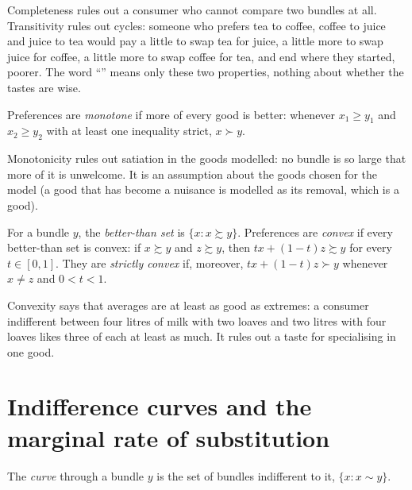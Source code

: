 Completeness rules out a consumer who cannot compare two bundles at all.
Transitivity rules out cycles: someone who prefers tea to coffee, coffee to
juice and juice to tea would pay a little to swap tea for juice, a little
more to swap juice for coffee, a little more to swap coffee for tea, and end
where they started, poorer. The word ``'' means only these two
properties, nothing about whether the tastes are wise.

\begin{definition}\label{def:b1:preferences-and-utility:monotone}
Preferences are \emph{monotone} if more of every good is better: whenever
$x_1 \ge y_1$ and $x_2 \ge y_2$ with at least one inequality strict,
$x \succ y$.
\end{definition}

Monotonicity rules out satiation in the goods modelled: no bundle is so
large that more of it is unwelcome. It is an assumption about the goods
chosen for the model (a good that has become a nuisance is modelled as its
removal, which is a good).

\begin{definition}\label{def:b1:preferences-and-utility:convex}
For a bundle $y$, the \emph{better-than set} is $\{x : x \succsim y\}$.
Preferences are \emph{convex} if every better-than set is convex: if
$x \succsim y$ and $z \succsim y$, then $tx + (1 - t)z \succsim y$ for every
$t \in [0, 1]$. They are \emph{strictly convex} if, moreover,
$tx + (1 - t)z \succ y$ whenever $x \neq z$ and $0 < t < 1$.
\end{definition}

Convexity says that averages are at least as good as extremes: a consumer
indifferent between four litres of milk with two loaves and two litres
with four loaves likes three of each at least as much. It rules out a taste
for specialising in one good.

\section{Indifference curves and the marginal rate of substitution}\label{sec:b1:preferences-and-utility:curves}

\begin{definition}\label{def:b1:preferences-and-utility:indifference-curve}
The \emph{ curve} through a bundle $y$ is the set of bundles
indifferent to it, $\{x : x \sim y\}$.
\end{definition}

